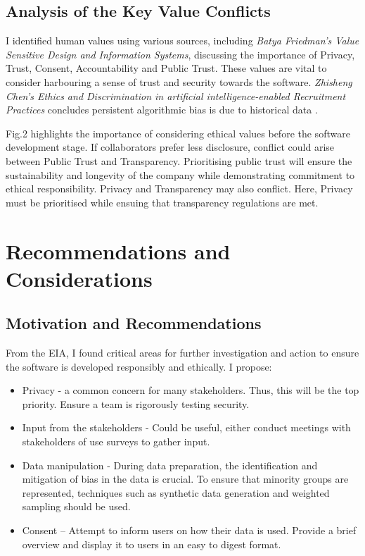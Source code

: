 \documentclass[10pt,journal,compsoc]{IEEEtran}
\begin{document}
\subsection{Analysis of the Key Value Conflicts}
I identified human values using various sources, including \textit{Batya Friedman’s Value Sensitive Design and Information Systems}, discussing the importance of Privacy, Trust, Consent, Accountability and Public Trust\cite{Friedman2009Value}. These values are vital to consider harbouring a sense of trust and security towards the software. \textit{Zhisheng Chen’s Ethics and Discrimination in artificial intelligence-enabled Recruitment Practices} concludes persistent algorithmic bias is due to historical data \cite{Discrimination}.

Fig.2 highlights the importance of considering ethical values before the software development stage. If collaborators prefer less disclosure, conflict could arise between Public Trust and Transparency. Prioritising public trust will ensure the sustainability and longevity of the company while demonstrating commitment to ethical responsibility. Privacy and Transparency may also conflict. Here, Privacy must be prioritised while ensuing that transparency regulations are met. 


\section{Recommendations and Considerations}
\subsection{Motivation and Recommendations}
From the EIA, I found critical areas for further investigation and action to ensure the software is developed responsibly and ethically. I propose:
\begin{itemize}
    \item Privacy - a common concern for many stakeholders. Thus, this will be the top priority. Ensure a team is rigorously testing security.
    \item Input from the stakeholders - Could be useful, either conduct meetings with stakeholders of use surveys to gather input.
    \item Data manipulation - During data preparation, the identification and mitigation of bias in the data is crucial. To ensure that minority groups are represented, techniques such as synthetic data generation and weighted sampling should be used.
    \item Consent – Attempt to inform users on how their data is used. Provide a brief overview and display it to users in an easy to digest format.
\end{itemize}
\end{document}
